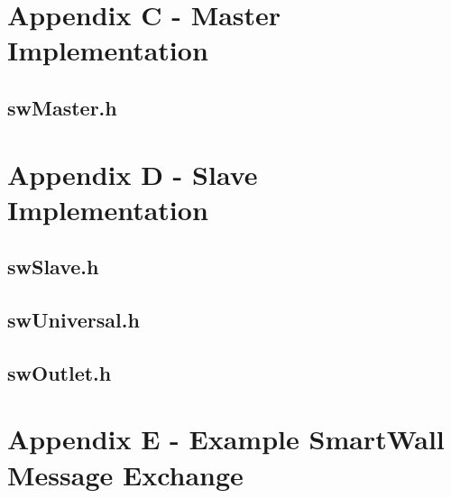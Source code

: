 \documentclass[12pt]{article}
\begin{document}
\pagebreak

\section{Appendix C - Master Implementation}
\label{sec:AppendixC}

\pagebreak

\subsection{swMaster.h}
\label{sec:AppendixC.swMaster.h}


\pagebreak

\section{Appendix D - Slave Implementation}
\label{sec:AppendixD}

\pagebreak

\subsection{swSlave.h}
\label{sec:AppendixD.swSlave.h}


\pagebreak

\subsection{swUniversal.h}
\label{sec:AppendixD.swUniversal.h}


\pagebreak

\subsection{swOutlet.h}
\label{sec:AppendixD.swOutlet.h}


\pagebreak

\section{Appendix E - Example SmartWall Message Exchange}
\label{sec:AppendixE}



\pagebreak
\end{document}
